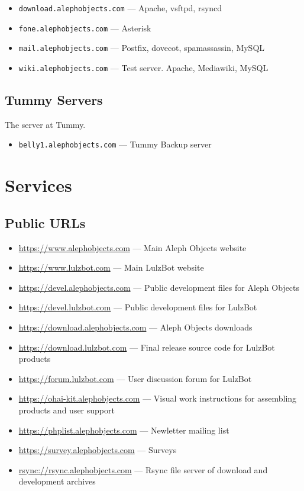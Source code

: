 \begin{itemize}
\item \texttt{download.alephobjects.com} --- Apache, vsftpd, rsyncd
\item \texttt{fone.alephobjects.com} --- Asterisk
\item \texttt{mail.alephobjects.com} --- Postfix, dovecot, spamassassin, MySQL 
\item \texttt{wiki.alephobjects.com} --- Test server. Apache, Mediawiki, MySQL
\end{itemize}

\subsection{Tummy Servers}
The server at Tummy.

\begin{itemize}
\item \texttt{belly1.alephobjects.com} --- Tummy Backup server
\end{itemize}

\section{Services}
\subsection{Public URLs}
\begin{itemize}
\item \url{https://www.alephobjects.com} --- Main Aleph Objects website
\item \url{https://www.lulzbot.com} --- Main LulzBot website
\item \url{https://devel.alephobjects.com} --- Public development files for
       Aleph Objects
\item \url{https://devel.lulzbot.com} --- Public development files for LulzBot
\item \url{https://download.alephobjects.com} --- Aleph Objects downloads
\item \url{https://download.lulzbot.com} --- Final release source code for
       LulzBot products
\item \url{https://forum.lulzbot.com} --- User discussion forum for LulzBot
\item \url{https://ohai-kit.alephobjects.com} --- Visual work instructions for
       assembling products and user support
\item \url{https://phplist.alephobjects.com} --- Newletter mailing list
\item \url{https://survey.alephobjects.com} --- Surveys
\item \url{rsync://rsync.alephobjects.com} --- Rsync file server of download
       and development archives
\end{itemize}

